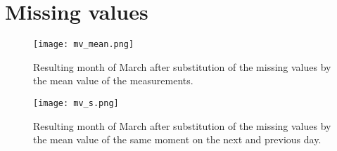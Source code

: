 \section{Missing values}

\begin{figure}[h!]
	\centering
	\texttt{[image: mv\_mean.png]}
	\caption{Resulting month of March after substitution of the missing values by the mean value of the measurements. }
	\label{fig:mv_mean}
\end{figure}

\begin{figure}[h!]
	\centering
	\texttt{[image: mv\_s.png]}
	\caption{Resulting month of March after substitution of the missing values by the mean value of the same moment on the next and previous day.}
	\label{fig:mv_s}
\end{figure}


